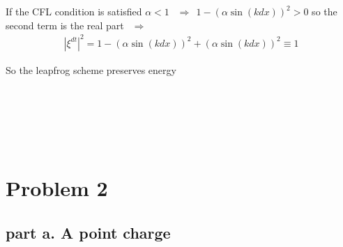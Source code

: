 \documentclass[showpacs, oneside, onecolumn, prl, amsmath, amssymb, nofootinbib, superscriptaddress, notitlepage]{revtex4-1}
\newcommand\bas{\begin{align*}}
\newcommand\RA{$\ \ \Rightarrow\ \ $}
\begin{document}
If the CFL condition is satisfied $\alpha<1$ \RA $1-(\alpha\sin(kdx))^2>0$ so the second term is the real part \RA
\bas
|\xi^{dt}|^2=1-(\alpha\sin(kdx))^2+(\alpha\sin(kdx))^2\equiv1
\end{align*}

So the leapfrog scheme preserves energy

~~~~

~~~~

~~~~

\section{Problem 2}

\subsection{part a. A point charge}
\end{document}
